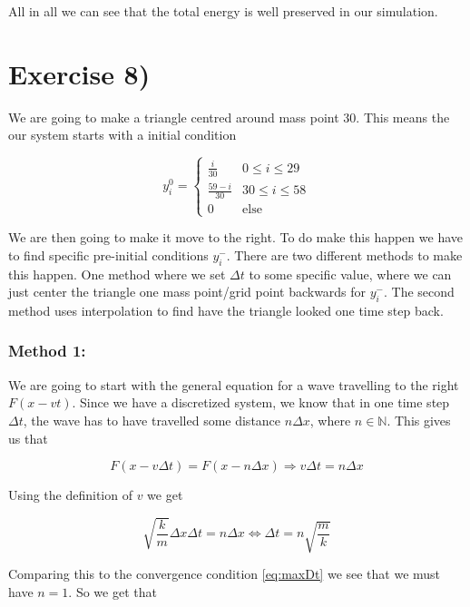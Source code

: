 \documentclass[a4paper,norsk, 10pt]{article}
\begin{document}
All in all we can see that the total energy is well preserved in our simulation.

\section{Exercise 8)}
We are going to make a triangle centred around mass point 30. This means the our system starts with a initial condition

\begin{equation}
y_i^0 =
\begin{cases}
\frac{i}{30} & 0 \leq i \leq 29\\
\frac{59-i}{30} & 30 \leq i \leq 58\\
0 & \text{else}
\end{cases}
\end{equation}

We are then going to make it move to the right. To do make this happen we have to find specific pre-initial conditions $y_i^-$. There are two different methods to make this happen. One method where we set $\Delta t$ to some specific value, where we can just center the triangle one mass point/grid point backwards for $y_i^-$. The second method uses interpolation to find have the triangle looked one time step back.

\subsubsection*{Method 1:}

We are going to start with the general equation for a wave travelling to the right $F(x - vt)$. Since we have a discretized system, we know that in one time step $\Delta t$, the wave has to have travelled some distance $n\Delta x$, where $n \in \mathbb{N}$. This gives us that

\begin{equation}
F(x - v\Delta t) = F(x - n\Delta x) \Rightarrow v\Delta t = n\Delta x
\end{equation}

Using the definition of $v$ we get

\begin{equation}
\sqrt{\frac{k}{m}}\Delta x \Delta t = n\Delta x \Leftrightarrow \Delta t = n\sqrt{\frac{m}{k}}
\label{eq:initialTriangle}
\end{equation}

Comparing this to the convergence condition \eqref{eq:maxDt} we see that we must have $n = 1$. So we get that
\end{document}
